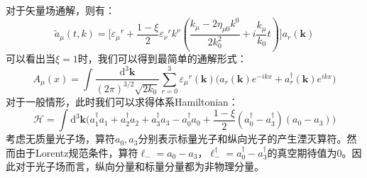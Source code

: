 对于矢量场通解，则有：
\begin{equation}
\tilde{a}_\mu(t,k)=\Big[{\varepsilon_\mu}^r+\frac{1-\xi}{2}{\varepsilon_\nu}^rk^\nu\left( \frac{k_\mu-2\eta_{\mu0}k^0}{2k_0^2}+i\frac{k_\mu}{k_0}t\right)\Big]a_r(\boldsymbol{k})
\end{equation}
可以看出当$\xi=1$时，我们可以得到最简单的通解形式：
\begin{equation}
A_\mu(x)=\int\frac{\mathrm{d}^3\boldsymbol{k}}{(2\pi)^{3/2}\sqrt{2k_0}}\sum_{r=0}^3{\varepsilon_\mu}^r(\boldsymbol{k})\Big(a_r(\boldsymbol{k})e^{-ikx}+a^\dagger_r(\boldsymbol{k})e^{ikx}\Big)
\end{equation}
对于一般情形，此时我们可以求得体系Hamiltonian：
\begin{equation}
\mathcal{H}=\int\mathrm{d}^3\boldsymbol{k}\Big(a_1^\dagger a_1+a_2^\dagger a_2 +a_3^\dagger a_3-a_0^\dagger a_0 +\frac{1-\xi}{2}(a_0^\dagger-a_3^\dagger)(a_0-a_3)\Big)
\end{equation}
考虑无质量光子场，算符$a_0,a_3$分别表示标量光子和纵向光子的产生湮灭算符。然而由于Lorentz规范条件，算符$\ell_-=a_0-a_3$，$\ell_-^\dagger=a^\dagger_0-a^\dagger_3$的真空期待值为0。因此对于光子场而言，纵向分量和标量分量都为非物理分量。

